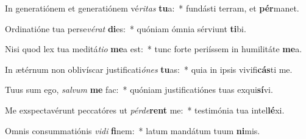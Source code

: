 \item In generatiónem et generatiónem vé\textit{ri}\textit{tas} \textbf{tu}a:~* fundásti terram, et \textbf{pér}manet.
\item Ordinatióne tua perse\textit{vé}\textit{rat} \textbf{di}es:~* quóniam ómnia sérviunt \textbf{ti}bi.
\item Nisi quod lex tua meditá\textit{ti}\textit{o} \textbf{me}a est:~* tunc forte periíssem in humilitáte \textbf{me}a.
\item In ætérnum non oblivíscar justificati\textit{ó}\textit{nes} \textbf{tu}as:~* quia in ipsis vivifi\textbf{cás}ti me.
\item Tuus sum ego, \textit{sal}\textit{vum} \textbf{me} fac:~* quóniam justificatiónes tuas exqui\textbf{sí}vi.
\item Me exspectavérunt peccatóres ut \textit{pér}\textit{de}\textbf{rent} me:~* testimónia tua intel\textbf{lé}xi.
\item Omnis consummatiónis \textit{vi}\textit{di} \textbf{fi}nem:~* latum mandátum tuum \textbf{ni}mis.
